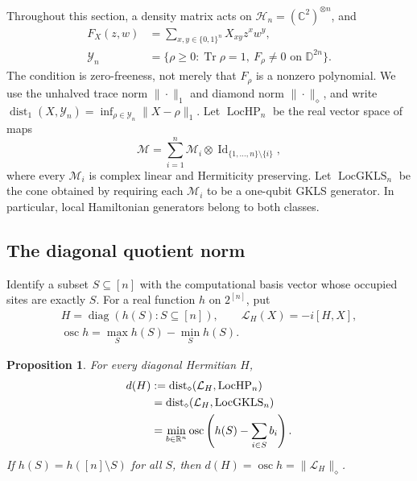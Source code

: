 \documentclass[reqno]{amsart}
\newtheorem{proposition}[theorem]{Proposition}
\theoremstyle{definition}
\theoremstyle{remark}
\newcommand{\C}{\mathbb C}
\newcommand{\R}{\mathbb R}
\newcommand{\D}{\mathbb D}
\DeclareMathOperator{\Tr}{Tr}
\DeclareMathOperator{\Id}{Id}
\DeclareMathOperator{\diag}{diag}
\begin{document}
Throughout this section, a density matrix acts on
$\mathcal H_n=(\C^2)^{\otimes n}$, and
\begin{align*}
 F_X(z,w)&=\sum_{x,y\in\{0,1\}^n}X_{xy}z^xw^y,\\
 \mathcal Y_n&=\{\rho\geq0:\Tr\rho=1,\ 
                 F_\rho\ne0\text{ on }\D^{2n}\}.
\end{align*}
The condition is zero-freeness, not merely that $F_\rho$ is a nonzero
polynomial.  We use the unhalved trace norm $\|\cdot\|_1$ and diamond norm
$\|\cdot\|_\diamond$, and write
$\operatorname{dist}_1(X,\mathcal Y_n)=
\inf_{\rho\in\mathcal Y_n}\|X-\rho\|_1$.
Let $\operatorname{LocHP}_n$ be the real vector space of maps
\[
 \mathcal M=\sum_{i=1}^n
       \mathcal M_i\otimes\Id_{\{1,\ldots,n\}\setminus\{i\}},
\]
where every $\mathcal M_i$ is complex linear and Hermiticity preserving.
Let $\operatorname{LocGKLS}_n$ be the cone obtained by requiring each
$\mathcal M_i$ to be a one-qubit GKLS generator.  In particular, local
Hamiltonian generators belong to both classes.

\subsection{The diagonal quotient norm}

Identify a subset $S\subseteq[n]$ with the computational basis vector
whose occupied sites are exactly $S$.  For a real function $h$ on $2^{[n]}$,
put
\begin{gather*}
 H=\diag(h(S):S\subseteq[n]),\qquad
 \mathcal L_H(X)=-i[H,X],\\
 \operatorname{osc}h=\max_S h(S)-\min_S h(S).
\end{gather*}

\begin{proposition}
\label{rob:distance}
For every diagonal Hermitian $H$,
\begin{align}
 d(H)
 &:=
 \operatorname{dist}_\diamond(\mathcal L_H,\operatorname{LocHP}_n)
 \notag\\
 &=\operatorname{dist}_\diamond(\mathcal L_H,\operatorname{LocGKLS}_n)
 \notag\\
 &=\min_{b\in\R^n}\operatorname{osc}
       \left(h(S)-\sum_{i\in S}b_i\right).
 \label{rob:distance-formula}
\end{align}
If $h(S)=h([n]\setminus S)$ for all $S$, then
$d(H)=\operatorname{osc}h=\|\mathcal L_H\|_\diamond$.
\end{proposition}
\end{document}

